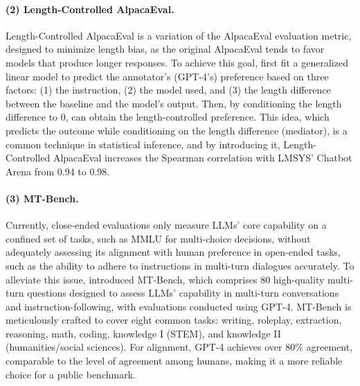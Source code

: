 \documentclass[11pt]{article}
\begin{document}
\paragraph{(2) Length-Controlled AlpacaEval.}
Length-Controlled AlpacaEval \cite{dubois2024length} is a variation of the AlpacaEval \cite{alpaca_eval} evaluation metric, designed to minimize length bias, as the original AlpacaEval tends to favor models that produce longer responses. To achieve this goal, \citet{dubois2024length} first fit a generalized linear model to predict the annotator's (GPT-4's) preference based on three factors: (1) the instruction, (2) the model used, and (3) the length difference between the baseline and the model’s output. Then, by conditioning the length difference to 0, \citet{dubois2024length} can obtain the length-controlled preference. This idea, which predicts the outcome while conditioning on the length difference (mediator), is a common technique in statistical inference, and by introducing it, Length-Controlled AlpacaEval increases the Spearman correlation with LMSYS’ Chatbot Arena from 0.94 to 0.98.



\paragraph{(3) MT-Bench.}
Currently, close-ended evaluations only measure LLMs’ core capability on a confined set of tasks, such as MMLU \cite{hendrycks2020measuring} for multi-choice decisions, without adequately assessing its alignment with human preference in open-ended tasks, such as the ability to adhere to instructions in multi-turn dialogues accurately. To alleviate this issue, \citet{zheng2023judging} introduced MT-Bench, which comprises 80 high-quality multi-turn questions designed to assess LLMs' capability in multi-turn conversations and instruction-following, with evaluations conducted using GPT-4. MT-Bench is meticulously crafted to cover eight common tasks: writing, roleplay, extraction, reasoning, math, coding, knowledge I (STEM), and knowledge II (humanities/social sciences). For alignment, GPT-4 achieves over 80\% agreement, comparable to the level of agreement among humans, making it a more reliable choice for a public benchmark.
\end{document}

